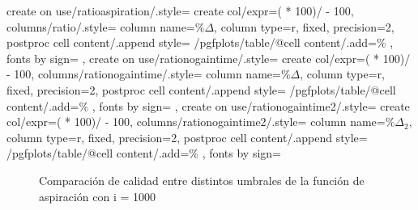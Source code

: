{    %
    create on use/ratioaspiration/.style=
        {create col/expr={( * 100)/  - 100}},
    columns/ratio/.style={
        column name=$\% \Delta$,
        column type={r},
        fixed, precision=2,
        postproc cell content/.append style={
            /pgfplots/table/@cell content/.add={}{\%}
        },
        fonts by sign={}{\color{red}}
    },
    create on use/rationogaintime/.style=
        {create col/expr={( * 100)/  - 100}},
    columns/rationogaintime/.style={
        column name=$\% \Delta$,
        column type={r},
        fixed, precision=2,
        postproc cell content/.append style={
            /pgfplots/table/@cell content/.add={}{\%}
        },
        fonts by sign={}{\color{red}}
    },
    create on use/rationogaintime2/.style=
        {create col/expr={( * 100)/  - 100}},
    columns/rationogaintime2/.style={
        column name=$\% \Delta_2$,
        column type={r},
        fixed, precision=2,
        postproc cell content/.append style={
            /pgfplots/table/@cell content/.add={}{\%}
        },
        fonts by sign={}{\color{red}}
    }
}



\begin{figure}[H]
    \centering
    \caption{Comparación de calidad entre distintos umbrales de la función de aspiración con i = 1000}
    \pgfplotstabletypeset[
        columns={0, solutions, localsearch, lowiterationlowaspiration, lowiterationhighaspiration, lowiterationfullaspiration}
    ]{\optimalsolutions}
\end{figure}

